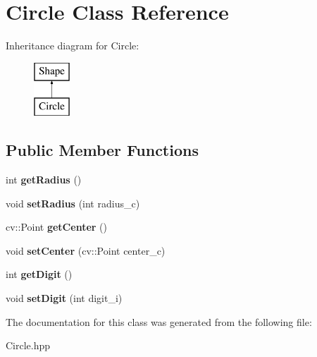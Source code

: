 \hypertarget{class_circle}{}\section{Circle Class Reference}
\label{class_circle}
Inheritance diagram for Circle\+:\begin{figure}[H]
\begin{center}
\leavevmode
\includegraphics[height=2.000000cm]{class_circle}
\end{center}
\end{figure}
\subsection*{Public Member Functions}
\begin{DoxyCompactItemize}
\item 
\mbox{\label{class_circle_adfc2e5e026f5d80215563cc42260a237}} 
int {\bfseries get\+Radius} ()
\item 
\mbox{\label{class_circle_ae4a8bd93b437b4cf0077483ff84c8626}} 
void {\bfseries set\+Radius} (int radius\+\_\+c)
\item 
\mbox{\label{class_circle_a60d1af499a6ad295f9f2955c4409dddd}} 
cv\+::\+Point {\bfseries get\+Center} ()
\item 
\mbox{\label{class_circle_a242599150a3623ea837fcb599214e33b}} 
void {\bfseries set\+Center} (cv\+::\+Point center\+\_\+c)
\item 
\mbox{\label{class_circle_a50656c826a70e13fa75eb696a0dd3123}} 
int {\bfseries get\+Digit} ()
\item 
\mbox{\label{class_circle_a187d5c4d66124603abb89f57552b6c4c}} 
void {\bfseries set\+Digit} (int digit\+\_\+i)
\end{DoxyCompactItemize}


The documentation for this class was generated from the following file\+:\begin{DoxyCompactItemize}
\item 
Circle.\+hpp\end{DoxyCompactItemize}
